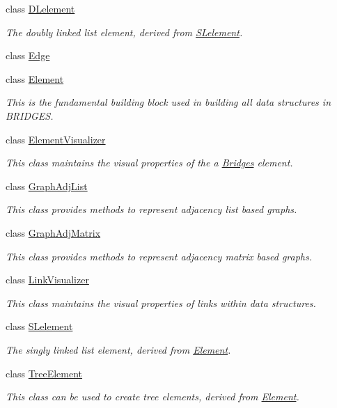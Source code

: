 \begin{DoxyCompactItemize}
class \hyperlink{classbridges_1_1_d_lelement}{D\+Lelement}
\begin{DoxyCompactList}\small\item\em The doubly linked list element, derived from \hyperlink{classbridges_1_1_s_lelement}{S\+Lelement}. \end{DoxyCompactList}\item 
class \hyperlink{classbridges_1_1_edge}{Edge}
\item 
class \hyperlink{classbridges_1_1_element}{Element}
\begin{DoxyCompactList}\small\item\em This is the fundamental building block used in building all data structures in B\+R\+I\+D\+G\+E\+S. \end{DoxyCompactList}\item 
class \hyperlink{classbridges_1_1_element_visualizer}{Element\+Visualizer}
\begin{DoxyCompactList}\small\item\em This class maintains the visual properties of the a \hyperlink{namespacebridges_1_1_bridges}{Bridges} element. \end{DoxyCompactList}\item 
class \hyperlink{classbridges_1_1_graph_adj_list}{Graph\+Adj\+List}
\begin{DoxyCompactList}\small\item\em This class provides methods to represent adjacency list based graphs. \end{DoxyCompactList}\item 
class \hyperlink{classbridges_1_1_graph_adj_matrix}{Graph\+Adj\+Matrix}
\begin{DoxyCompactList}\small\item\em This class provides methods to represent adjacency matrix based graphs. \end{DoxyCompactList}\item 
class \hyperlink{classbridges_1_1_link_visualizer}{Link\+Visualizer}
\begin{DoxyCompactList}\small\item\em This class maintains the visual properties of links within data structures. \end{DoxyCompactList}\item 
class \hyperlink{classbridges_1_1_s_lelement}{S\+Lelement}
\begin{DoxyCompactList}\small\item\em The singly linked list element, derived from \hyperlink{classbridges_1_1_element}{Element}. \end{DoxyCompactList}\item 
class \hyperlink{classbridges_1_1_tree_element}{Tree\+Element}
\begin{DoxyCompactList}\small\item\em This class can be used to create tree elements, derived from \hyperlink{classbridges_1_1_element}{Element}. \end{DoxyCompactList}\end{DoxyCompactItemize}
